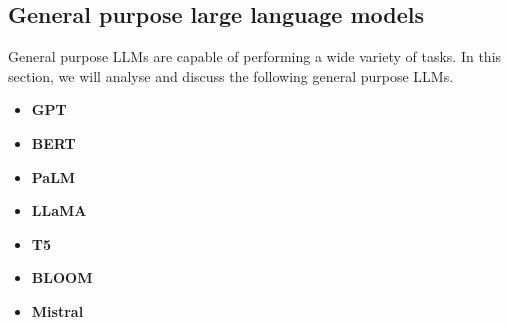 \subsection{General purpose large language models}
General purpose LLMs are capable of performing a wide variety of tasks. %
In this section, we will analyse and discuss the following general purpose LLMs.
\begin{itemize}
    \item \textbf{GPT}
    \item \textbf{BERT}

    \item \textbf{PaLM}

    \item \textbf{LLaMA}

    \item \textbf{T5}
    
    \item \textbf{BLOOM}

    \item \textbf{Mistral}
\end{itemize}


